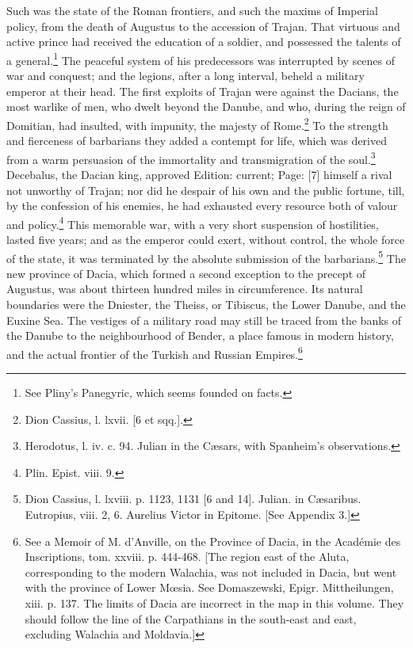 Such was the state of the Roman frontiers, and such the maxims of Imperial policy, from the death of Augustus to the accession of Trajan. That virtuous and active prince had received the education of a soldier, and possessed the talents of a general.\footnote{See Pliny\texthebrew{}’s Panegyric, which seems founded on facts.} The peaceful system of his predecessors was interrupted by scenes of war and conquest; and the legions, after a long interval, beheld a military emperor at their head. The first exploits of Trajan were against the Dacians, the most warlike of men, who dwelt beyond the Danube, and who, during the reign of Domitian, had insulted, with impunity, the majesty of Rome.\footnote{Dion Cassius, l. lxvii. [6 et sqq.].} To the strength and fierceness of barbarians they added a contempt for life, which was derived from a warm persuasion of the immortality and transmigration of the soul.\footnote{Herodotus, l. iv. c. 94. Julian in the Cæsars, with Spanheim\texthebrew{}’s observations.} Decebalus, the Dacian king, approved Edition: current; Page: [7] himself a rival not unworthy of Trajan; nor did he despair of his own and the public fortune, till, by the confession of his enemies, he had exhausted every resource both of valour and policy.\footnote{Plin. Epist. viii. 9.} This memorable war, with a very short suspension of hostilities, lasted five years; and as the emperor could exert, without control, the whole force of the state, it was terminated by the absolute submission of the barbarians.\footnote{Dion Cassius, l. lxviii. p. 1123, 1131 [6 and 14]. Julian. in Cæsaribus. Eutropius, viii. 2, 6. Aurelius Victor in Epitome. [See Appendix 3.]} The new province of Dacia, which formed a second exception to the precept of Augustus, was about thirteen hundred miles in circumference. Its natural boundaries were the Dniester, the Theiss, or Tibiscus, the Lower Danube, and the Euxine Sea. The vestiges of a military road may still be traced from the banks of the Danube to the neighbourhood of Bender, a place famous in modern history, and the actual frontier of the Turkish and Russian Empires.\footnote{See a Memoir of M. d\texthebrew{}’Anville, on the Province of Dacia, in the Académie des Inscriptions, tom. xxviii. p. 444-468. [The region east of the Aluta, corresponding to the modern Walachia, was not included in Dacia, but went with the province of Lower Mœsia. See Domaszewski, Epigr. Mittheilungen, xiii. p. 137. The limits of Dacia are incorrect in the map in this volume. They should follow the line of the Carpathians in the south-east and east, excluding Walachia and Moldavia.]}

